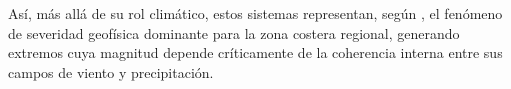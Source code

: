 Así, más allá de su rol climático, estos sistemas representan, según \citet{gramcianinov2023impact}, el fenómeno de severidad geofísica dominante para la zona costera regional, generando extremos cuya magnitud depende críticamente de la coherencia interna entre sus campos de viento y precipitación.

